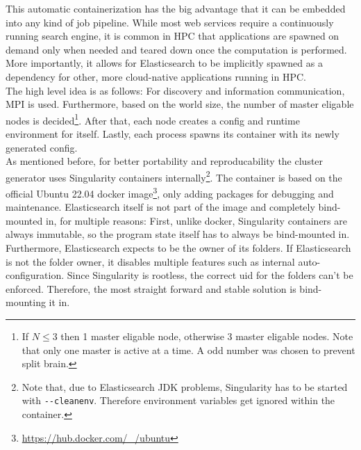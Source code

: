 This automatic containerization has the big advantage that it can be embedded into any kind of job pipeline. While most web services require a continuously running search engine, it is common in \ac{HPC} that applications are spawned on demand only when needed and teared down once the computation is performed. More importantly, it allows for Elasticsearch to be implicitly spawned as a dependency for other, more cloud-native applications running in \ac{HPC}.\\

The high level idea is as follows: For discovery and information communication, \ac{MPI} is used. Furthermore, based on the world size, the number of master eligable nodes is decided\footnote{If $N \leq 3$ then 1 master eligable node, otherwise 3 master eligable nodes. Note that only one master is active at a time. A odd number was chosen to prevent split brain.}. After that, each node creates a config and runtime environment for itself. Lastly, each process spawns its container with its newly generated config.\\

As mentioned before, for better portability and reproducability the cluster generator uses Singularity containers internally\footnote{Note that, due to Elasticsearch JDK problems, Singularity has to be started with \texttt{-{}-cleanenv}. Therefore environment variables get ignored within the container.}. The container is based on the official Ubuntu 22.04 docker image\footnote{\url{https://hub.docker.com/_/ubuntu}}, only adding packages for debugging and maintenance. Elasticsearch itself is not part of the image and completely bind-mounted in, for multiple reasons: First, unlike docker, Singularity containers are always immutable, so the program state itself has to always be bind-mounted in. Furthermore, Elasticsearch expects to be the owner of its folders. If Elasticsearch is not the folder owner, it disables multiple features such as internal auto-configuration. Since Singularity is rootless, the correct uid for the folders can't be enforced. Therefore, the most straight forward and stable solution is bind-mounting it in.\\


